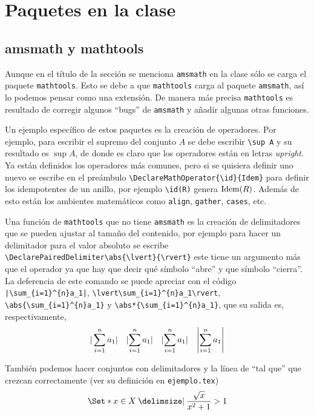 
\chapter{Paquetes en la clase}

\section{amsmath y mathtools}
Aunque en el título de la sección se menciona \texttt{amsmath} en la clase
sólo se carga el paquete \texttt{mathtools}. Esto se debe a que
\texttt{mathtools} carga al paquete \texttt{amsmath}, así lo podemos pensar
como una extensión. De manera más precisa \texttt{mathtools} es resultado de
corregir algunos \enquote{bugs} de \texttt{amsmath} y añadir algunas otras funciones.

Un ejemplo específico de estos paquetes es la creación de operadores. Por
ejemplo, para escribir el supremo del conjunto \(A\) se debe escribir
\verb|\sup A| y su resultado es \(\sup A\), de donde es claro que los
operadores están en letras \textit{upright}. Ya están definidos los
operadores más comunes, pero si se quisiera definir uno nuevo se escribe en
el preámbulo \verb|\DeclareMathOperator{\id}{Idem}| para definir los
idempotentes de un anillo, por ejemplo \verb|\id(R)| genera \(\id(R)\).
Además de esto están los ambientes matemáticos como \texttt{align},
\texttt{gather}, \texttt{cases}, etc.

Una función de \texttt{mathtools} que no tiene \texttt{amsmath} es la creación
de delimitadores que se pueden ajustar al tamaño del contenido, por ejemplo
para hacer un delimitador para el valor absoluto se escribe
\verb|\DeclarePairedDelimiter\abs{\lvert}{\rvert}| este
tiene un argumento más que el operador ya que hay que decir qué símbolo
\enquote{abre} y que símbolo \enquote{cierra}. La deferencia de este comando se puede
apreciar con el código \verb!|\sum_{i=1}^{n}a_1|!,
\verb|\lvert\sum_{i=1}^{n}a_1\rvert|, \verb|\abs{\sum_{i=1}^{n}a_1}| y
\verb|\abs*{\sum_{i=1}^{n}a_1}|, que su salida es, respectivamente,
\[
  |\sum_{i=1}^{n}a_1| \quad \lvert\sum_{i=1}^{n}a_1\rvert \quad
  \abs{\sum_{i=1}^{n}a_1} \quad \abs*{\sum_{i=1}^{n}a_1}
\]

También podemos hacer conjuntos con delimitadores y la línea de \enquote{tal que}
que crezcan correctamente (ver su definición en \texttt{ejemplo.tex})
\[
  \Set*{ x \in X \given \frac{\sqrt{x}}{x^2+1} > 1 }
\]


